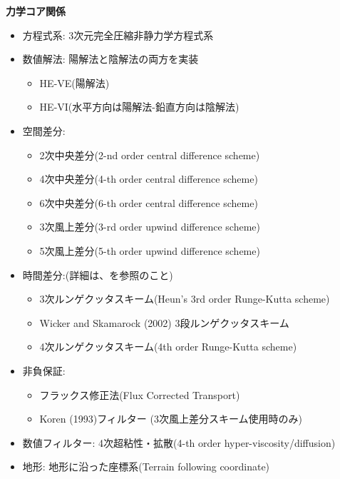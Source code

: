 {\bf 力学コア関係}
\begin{itemize}
 \item 方程式系: 3次元完全圧縮非静力学方程式系
 \item 数値解法: 陽解法と陰解法の両方を実装
   \begin{itemize}
    \item HE-VE(陽解法)
    \item HE-VI(水平方向は陽解法-鉛直方向は陰解法)
   \end{itemize}
 \item 空間差分:
    \begin{itemize}
      \item 2次中央差分(2-nd order central difference scheme)
      \item 4次中央差分(4-th order central difference scheme)
      \item 6次中央差分(6-th order central difference scheme)
      \item 3次風上差分(3-rd order upwind difference scheme)
      \item 5次風上差分(5-th order upwind difference scheme)
    \end{itemize}
 \item 時間差分:(詳細は、\citet{scale_2015}を参照のこと)
    \begin{itemize}
      \item 3次ルンゲクッタスキーム(Heun's 3rd order Runge-Kutta scheme)
      \item Wicker and Skamarock (2002) 3段ルンゲクッタスキーム \citep[3-step Runge-Kutta scheme of ][]{Wicker_2002}
      \item 4次ルンゲクッタスキーム(4th order Runge-Kutta scheme)
    \end{itemize}
 \item 非負保証:
    \begin{itemize}
      \item フラックス修正法(Flux Corrected Transport)
      \item Koren (1993)フィルター \citep{Koren_1993} (3次風上差分スキーム使用時のみ)
    \end{itemize}
 \item 数値フィルター: 4次超粘性・拡散(4-th order hyper-viscosity/diffusion)
 \item 地形: 地形に沿った座標系(Terrain following coordinate)
\end{itemize}


